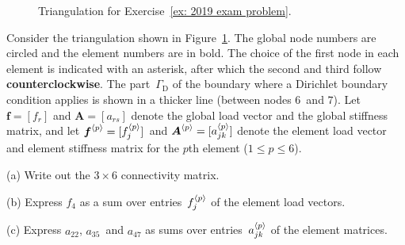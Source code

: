 \begin{Exercises}
\begin{figure}
\caption{Triangulation for Exercise~\ref{ex: 2019 exam problem}.}
\label{fig: 2019 exam problem}
\begin{center}
\end{center}
\end{figure}

\exercise\label{ex: 2019 exam problem}
Consider the triangulation shown in Figure~\ref{fig: 2019 exam problem}.
The global node numbers are circled and the element numbers are in bold.
The choice of the first node in each element is indicated with an asterisk,
after which the second and third follow \textbf{counterclockwise}. The
part~$\Gamma_{\mathrm{D}}$ of the boundary where a Dirichlet boundary 
condition applies is shown in a thicker line (between nodes $6$~and $7$).  Let
$\boldsymbol{f}=[f_r]$ and $\boldsymbol{A}=[a_{rs}]$ denote the global load 
vector and the global stiffness matrix, and let
$\boldsymbol{f}^{\langle p\rangle}=[f^{\langle p\rangle}_j]$~and 
$\boldsymbol{A}^{\langle p\rangle}=[a^{\langle p\rangle}_{jk}]$ denote 
the element load vector and element stiffness matrix for the $p$th element 
($1\le p\le6$).  
\begin{description}
\item{(a)} Write out the $3\times6$ connectivity matrix.
\item{(b)} Express $f_4$ as a sum over entries~$f^{\langle p\rangle}_j$ of the element 
load vectors.
\item{(c)} Express $a_{22}$, $a_{35}$~and $a_{47}$ as sums over 
entries~$a^{\langle p\rangle}_{jk}$ of the element matrices.
\end{description}


\end{Exercises}
